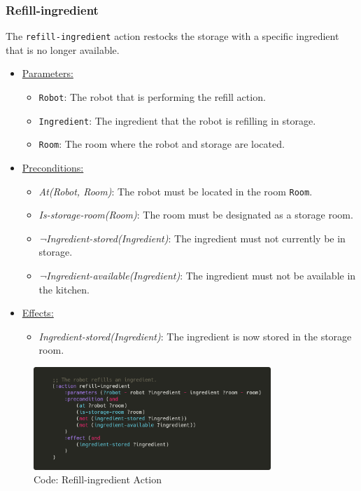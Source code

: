 \documentclass{article}
\begin{document}
\subsubsection{Refill-ingredient}
The \texttt{refill-ingredient} action restocks the storage with a specific ingredient that is no longer available.
\begin{itemize}
    \item \underline{Parameters:}
    \begin{itemize}
        \item \texttt{Robot}: The robot that is performing the refill action.
        \item \texttt{Ingredient}: The ingredient that the robot is refilling in storage.
        \item \texttt{Room}: The room where the robot and storage are located.
    \end{itemize}
    \item \underline{Preconditions:}
    \begin{itemize}
        \item \textit{At(Robot, Room)}: The robot must be located in the room \texttt{Room}.
        \item \textit{Is-storage-room(Room)}: The room must be designated as a storage room.
        \item \textit{¬Ingredient-stored(Ingredient)}: The ingredient must not currently be in storage.
        \item \textit{¬Ingredient-available(Ingredient)}: The ingredient must not be available in the kitchen.
    \end{itemize}
    \item \underline{Effects:}
    \begin{itemize}
        \item \textit{Ingredient-stored(Ingredient)}: The ingredient is now stored in the storage room.
    \end{itemize}
\end{itemize}
\begin{figure}[ht]
    \centering
    \includegraphics[width=0.80\textwidth]{assets/refill-ingredient.png}
    \caption{Code: Refill-ingredient Action}
    \label{fig:act:refill}
\end{figure}
\end{document}
